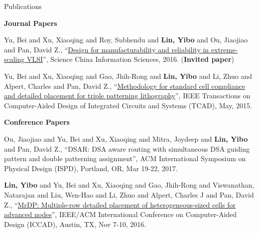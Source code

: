 
\begin{rSection}{Publications}



\textbf{Journal Papers}
        

\begin{description}[font=\normalfont]
    

\item[{[J2]}]{
        Yu, Bei and Xu, Xiaoqing and Roy, Subhendu and \textbf{Lin, Yibo} and Ou, Jiaojiao and Pan, David Z., 
    ``\href{http://link.springer.com/article/10.1007%2Fs11432-016-5560-6}{Design for manufacturability and reliability in extreme-scaling {VLSI}}'', 
    Science China Information Sciences, 2016.
    (\textbf{Invited paper})
}
        

\item[{[J1]}]{
        Yu, Bei and Xu, Xiaoqing and Gao, Jhih-Rong and \textbf{Lin, Yibo} and Li, Zhuo and Alpert, Charles and Pan, David Z., 
    ``\href{http://ieeexplore.ieee.org/xpl/articleDetails.jsp?tp=&arnumber=7036058}{Methodology for standard cell compliance and detailed placement for triple patterning lithography}'', 
    IEEE Transactions on Computer-Aided Design of Integrated Circuits and Systems (TCAD), May, 2015.
    
}
        

\end{description}
    

\textbf{Conference Papers}
        

\begin{description}[font=\normalfont]
    

\item[{[C9]}]{
        Ou, Jiaojiao and Yu, Bei and Xu, Xiaoqing and Mitra, Joydeep and \textbf{Lin, Yibo} and Pan, David Z., 
    ``DSAR: DSA aware routing with simultaneous DSA guiding pattern and double patterning assignment'', 
    ACM International Symposium on Physical Design (ISPD), Portland, OR, Mar 19-22, 2017.
    
}
        

\item[{[C8]}]{
        \textbf{Lin, Yibo} and Yu, Bei and Xu, Xiaoqing and Gao, Jhih-Rong and Viswanathan, Natarajan and Liu, Wen-Hao and Li, Zhuo and Alpert, Charles J and Pan, David Z., 
    ``\href{http://dx.doi.org/10.1145/2966986.2967055}{MrDP: Multiple-row detailed placement of heterogeneous-sized cells for advanced nodes}'', 
    IEEE/ACM International Conference on Computer-Aided Design (ICCAD), Austin, TX, Nov 7-10, 2016.
    
}
\end{description}
\end{rSection}
